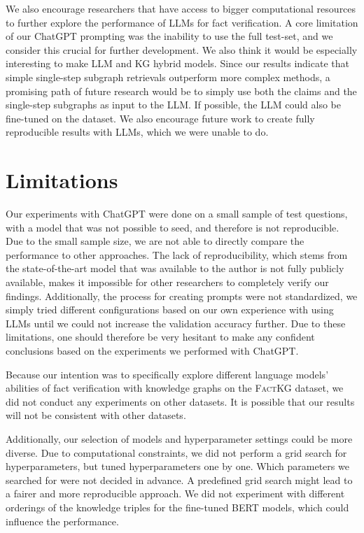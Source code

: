 \documentclass[11pt]{article}
\begin{document}
We also encourage researchers that have access to bigger computational resources to further explore the performance of LLMs for fact verification. A core limitation of our ChatGPT prompting was the inability to use the full test-set, and we consider this crucial for further development. We also think it would be especially interesting to make LLM and KG hybrid models. Since our results indicate that simple single-step subgraph retrievals outperform more complex methods, a promising path of future research would be to simply use both the claims and the single-step subgraphs as input to the LLM. If possible, the LLM could also be fine-tuned on the dataset. We also encourage future work to create fully reproducible results with LLMs, which we were unable to do.

\section{Limitations}

Our experiments with ChatGPT were done on a small sample of test questions, with a model that was not possible to seed, and therefore is not reproducible. Due to the small sample size, we are not able to directly compare the performance to other approaches. The lack of reproducibility, which stems from the state-of-the-art model that was available to the author is not fully publicly available, makes it impossible for other researchers to completely verify our findings. Additionally, the process for creating prompts were not standardized, we simply tried different configurations based on our own experience with using LLMs until we could not increase the validation accuracy further. Due to these limitations, one should therefore be very hesitant to make any confident conclusions based on the experiments we performed with ChatGPT.

Because our intention was to specifically explore different language models' abilities of fact verification with knowledge graphs on the \textsc{FactKG} dataset, we did not conduct any experiments on other datasets. It is possible that our results will not be consistent with other datasets.

Additionally, our selection of models and hyperparameter settings could be more diverse. Due to computational constraints, we did not perform a grid search for hyperparameters, but tuned hyperparameters one by one. Which parameters we searched for were not decided in advance. A predefined grid search might lead to a fairer and more reproducible approach. We did not experiment with different orderings of the knowledge triples for the fine-tuned BERT models, which could influence the performance.
\end{document}

